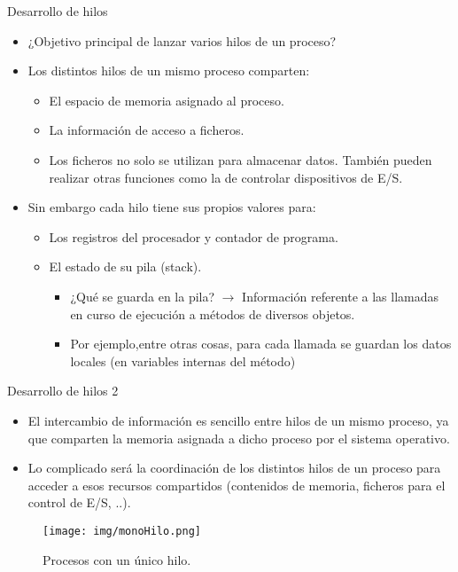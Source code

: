 \documentclass{beamer}
\begin{document}
\begin{frame}{Desarrollo de hilos}
    \begin{itemize}
    \item ¿Objetivo principal de lanzar varios hilos de un proceso?
    \item Los distintos hilos de un mismo proceso comparten:
    \begin{itemize}\item El espacio de memoria asignado al proceso.
    \item La información de acceso a ficheros.
    \item Los ficheros no solo se utilizan para almacenar datos. También pueden realizar otras funciones
    como la de controlar dispositivos de E/S.
    \end{itemize}
    \item Sin embargo cada hilo tiene sus propios valores para:
     \begin{itemize}\item Los registros del procesador y contador de programa.
    \item El estado de su pila (stack).
    \begin{itemize}
    \item ¿Qué se guarda en la pila? $\to$ Información referente a las llamadas en curso de ejecución a
    métodos de diversos objetos.
    \item Por ejemplo,entre otras cosas, para cada llamada se guardan los datos locales (en variables
    internas del método)
    \end{itemize}
\end{itemize}
\end{itemize}
\end{frame}
\begin{frame}{Desarrollo de hilos 2}
\begin{itemize}
    \item El intercambio de información es sencillo entre hilos de un mismo proceso, ya que
    comparten la memoria asignada a dicho proceso por el sistema operativo.
    \item Lo complicado será la coordinación de los distintos hilos de un proceso para acceder
    a esos recursos compartidos (contenidos de memoria, ficheros para el control de E/S, ..).
    \end{itemize}
\end{frame}

\begin{frame}
\begin{figure}
        \centering
        \texttt{[image: img/monoHilo.png]} 
        \caption{Procesos con un único hilo.}
    \end{figure}
\end{frame}
\end{document}
